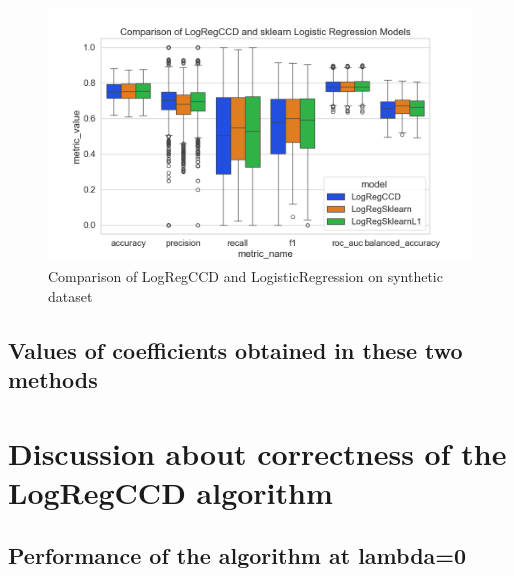 \documentclass[12pt]{article}
\begin{document}
\begin{figure}[h]
    \centering
  \includegraphics[width=\textwidth]{../results/comparison-synthetic-dataset.png}
    \caption{Comparison of LogRegCCD and LogisticRegression on synthetic dataset}
    \label{fig:comparison-synthetic-dataset}
  \end{figure}

\subsection{Values of coefficients obtained in these two methods}



\section{Discussion about correctness of the LogRegCCD algorithm}

\subsection{Performance of the algorithm at lambda=0}
\end{document}

